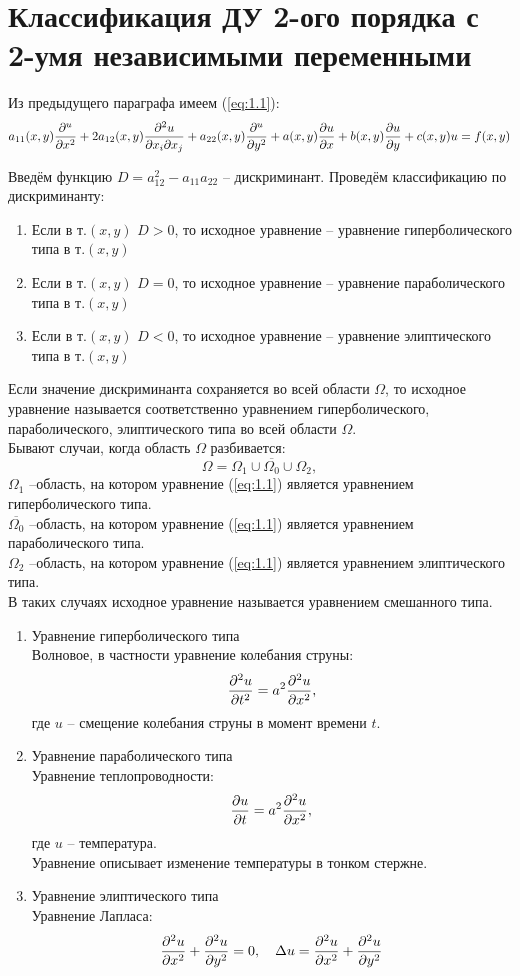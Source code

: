 \documentclass[../main.tex]{subfiles}
\begin{document}
\section{Классификация ДУ 2-ого порядка с 2-умя независимыми переменными}
Из предыдущего параграфа имеем (\ref{eq:1.1}):
\[
    a_{11}(x,y)\frac{\partial ^u}{\partial x^2} + 2a_{12}(x,y)\frac{\partial ^2u}{\partial x_i \partial{x_j}} +
    a_{22}(x,y)\frac{\partial ^u}{\partial y^2} + a(x,y)\frac{\partial u}{\partial x} + b(x,y)\frac{\partial u}{\partial y} + c(x,y)u = f(x,y)
\]

Введём функцию $D = a_{12}^2-a_{11}a_{22}$ -- дискриминант.
Проведём классификацию по дискриминанту:
\begin{enumerate}
    \item 
    Если в т.$(x,y)$ $D>0$, то исходное уравнение -- 
    уравнение гиперболического типа в т.$(x,y)$
    \item
    Если в т.$(x,y)$ $D=0$, то исходное уравнение -- 
    уравнение параболического типа в т.$(x,y)$
    \item
    Если в т.$(x,y)$ $D<0$, то исходное уравнение -- 
    уравнение элиптического типа в т.$(x,y)$
\end{enumerate}

Если значение дискриминанта сохраняется во всей области $\Omega$, 
то исходное уравнение называется соответственно уравнением гиперболического,
параболического, элиптического типа во всей области $\Omega$.\\

Бывают случаи, когда область $\Omega$ разбивается:
\[\Omega = \Omega_1 \cup \overline{\Omega_0} \cup \Omega_2, \]
$\Omega_1$ --область, на котором уравнение (\ref{eq:1.1}) является уравнением гиперболического типа.\\
$\overline{\Omega_0}$ --область, на котором уравнение (\ref{eq:1.1}) является уравнением параболического типа.\\
$\Omega_2$ --область, на котором уравнение (\ref{eq:1.1}) является уравнением элиптического типа.\\
В таких случаях исходное уравнение называется уравнением смешанного типа.

\begin{enumerate}
    \item Уравнение гиперболического типа\\
    Волновое, в частности уравнение колебания струны:
    \[\frac{\partial ^2u}{\partial t^2}=a^2\frac{\partial ^2u}{\partial x^2},\]
    где $u$ -- смещение колебания струны в момент времени $t$.
    \item Уравнение параболического типа\\
    Уравнение теплопроводности:
    \[\frac{\partial u}{\partial t}=a^2\frac{\partial ^2u}{\partial x^2},\]
    где $u$ -- температура.\\
    Уравнение описывает изменение температуры в тонком стержне.
    \item Уравнение элиптического типа\\
    Уравнение Лапласа:
    \[
        \frac{\partial ^2u}{\partial x^2}+\frac{\partial ^2u}{\partial y^2} = 0,\quad
        \Delta u=\frac{\partial ^2u}{\partial x^2}+\frac{\partial ^2u}{\partial y^2}
    \]
\end{enumerate}
\end{document}
